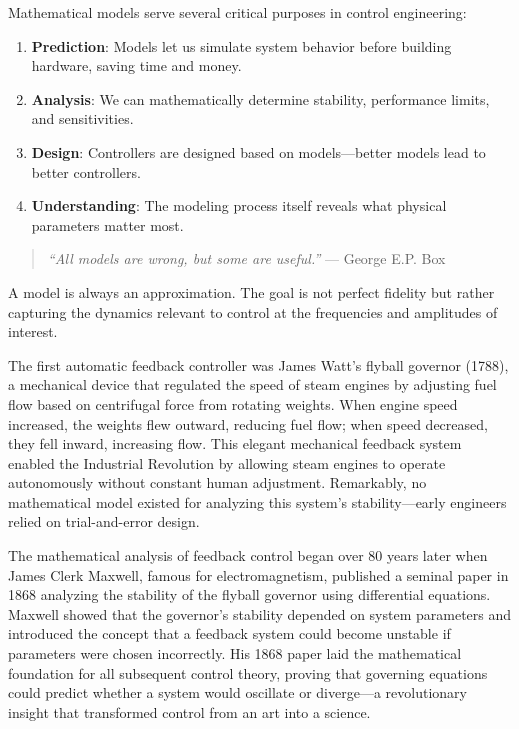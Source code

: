 Mathematical models serve several critical purposes in control engineering:

\begin{enumerate}
    \item \textbf{Prediction}: Models let us simulate system behavior before building hardware, saving time and money.

    \item \textbf{Analysis}: We can mathematically determine stability, performance limits, and sensitivities.

    \item \textbf{Design}: Controllers are designed based on models---better models lead to better controllers.

    \item \textbf{Understanding}: The modeling process itself reveals what physical parameters matter most.
\end{enumerate}

\begin{quote}
\textit{``All models are wrong, but some are useful.''} --- George E.P. Box
\end{quote}

A model is always an approximation. The goal is not perfect fidelity but rather capturing the dynamics relevant to control at the frequencies and amplitudes of interest.

\begin{historicalbox}[title=Historical Context: Watt's Flyball Governor and Early Feedback Control]
The first automatic feedback controller was James Watt's flyball governor (1788), a mechanical device that regulated the speed of steam engines by adjusting fuel flow based on centrifugal force from rotating weights. When engine speed increased, the weights flew outward, reducing fuel flow; when speed decreased, they fell inward, increasing flow. This elegant mechanical feedback system enabled the Industrial Revolution by allowing steam engines to operate autonomously without constant human adjustment. Remarkably, no mathematical model existed for analyzing this system's stability---early engineers relied on trial-and-error design.

The mathematical analysis of feedback control began over 80 years later when James Clerk Maxwell, famous for electromagnetism, published a seminal paper in 1868 analyzing the stability of the flyball governor using differential equations. Maxwell showed that the governor's stability depended on system parameters and introduced the concept that a feedback system could become unstable if parameters were chosen incorrectly. His 1868 paper laid the mathematical foundation for all subsequent control theory, proving that governing equations could predict whether a system would oscillate or diverge---a revolutionary insight that transformed control from an art into a science.
\end{historicalbox}

